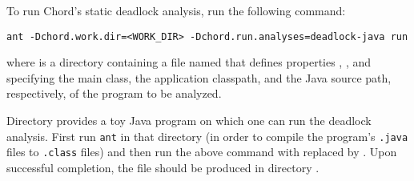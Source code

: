 To run Chord's static deadlock analysis,  run the following command:

\begin{framed}
\begin{verbatim}
ant -Dchord.work.dir=<WORK_DIR> -Dchord.run.analyses=deadlock-java run
\end{verbatim}
\end{framed}

where  is a directory
containing a file named  that defines
properties , , and
 specifying the main class, the application classpath,
and the Java source path, respectively, of the program to be analyzed.

Directory  provides a toy Java
program on which one can run the deadlock analysis.  First run {\tt ant} in that
directory (in order to compile the program's {\tt .java} files to {\tt .class}
files) and then run the above command with  replaced by
.  Upon successful completion, the
file  should be produced in directory
.

